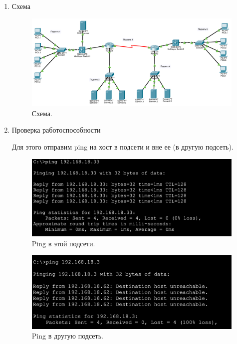 \documentclass[a4paper,14pt]{extreport} %
\begin{document}
\begin{enumerate}
\item Схема

\begin{figure}[H]
  \centering
  \includegraphics[scale=0.5]{8}
  \caption{Схема. }
\end{figure}

\newpage

\item Проверка работоспособности

Для этого отправим ping на хост в подсети и вне ее (в другую подсеть). 

\begin{figure}[H]
  \centering
  \includegraphics[scale=0.7]{9}
  \caption{Ping в этой подсети. }
\end{figure}

\begin{figure}[H]
  \centering
  \includegraphics[scale=0.7]{10}
  \caption{Ping в другую подсеть. }
\end{figure}

\end{enumerate}
\end{document}
